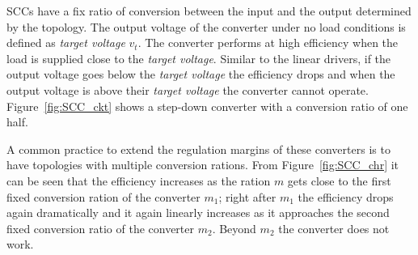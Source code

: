 SCCs have a fix ratio of conversion between the input and the output determined by the topology. The output voltage of the converter under no load conditions is defined as \emph{target voltage} $v_t$. The converter performs at high efficiency when the load is supplied close to the \emph{target voltage}. Similar to the linear drivers, if the output voltage goes below the \emph{target voltage} the efficiency drops and when the output voltage is above their \emph{target voltage} the converter cannot operate. Figure~\ref{fig:SCC_ckt} shows a step-down converter with a conversion ratio of one half.

A common practice to extend the regulation margins of these converters is to have topologies with multiple conversion rations. From Figure~\ref{fig:SCC_chr} it can be seen that the efficiency increases as the ration $m$ gets close to the first fixed conversion ration of the converter $m_1$; right after $m_1$ the efficiency drops again dramatically and it again linearly increases as it approaches the second fixed conversion ratio of the converter $m_2$. Beyond $m_2$ the converter does not work.


